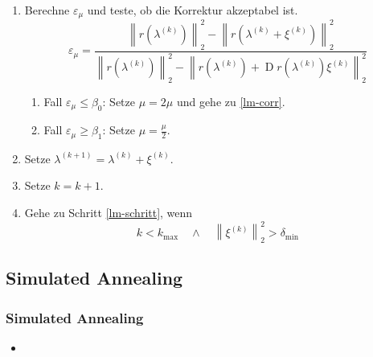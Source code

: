 \documentclass[aspectratio=169]{beamer}
\newcommand{\curvb}[1]{\left( #1 \right)}
\newcommand{\norm}[1]{\left\| #1 \right\|}
\DeclareMathOperator{\Deriv}{\m{D}}
\newcommand{\m}[1]{\mathrm{#1}}
\begin{document}
		\begin{frame}
			
			\begin{tcolorbox}[colframe=black,colbacktitle=white,coltitle=black, attach boxed title to top center={yshift=-2mm},enhanced, titlerule=0.1pt, boxrule=0.5pt, breakable, arc=5pt,title=Algorithmus:\quad Levenberg-Marquardt-Verfahren Teil 2]

				\begin{enumerate}[label=\normalfont (\arabic*), resume]
					\item Berechne $\varepsilon_\mu$ und teste, ob die Korrektur akzeptabel ist.
						\[ \varepsilon_\mu = \frac{ \norm{r\curvb{\lambda^{(k)}}}^2_2 - \norm{r\curvb{\lambda^{(k)}+\xi^{(k)}}}^2_2 }{ \norm{r\curvb{\lambda^{(k)}}}^2_2 - \norm{r\curvb{\lambda^{(k)}} + \Deriv r\curvb{\lambda^{(k)}}\xi^{(k)}}^2_2 } \]
						\begin{enumerate}[label=\normalfont (\roman*)]
							\item Fall $\varepsilon_\mu \leq \beta_0$: Setze $\mu = 2\mu$ und gehe zu \ref{lm-corr}.
							\item Fall $\varepsilon_\mu \geq \beta_1$: Setze $\mu = \frac{\mu}{2}$.
						\end{enumerate}
					\item Setze $\lambda^{(k+1)} = \lambda^{(k)} + \xi^{(k)}$.
					\item Setze $k=k+1$.
					\item Gehe zu Schritt \ref{lm-schritt}, wenn
						\[ k < k_\m{max} \quad \wedge \quad \norm{\xi^{(k)}}_2^2 > \delta_\m{min} \]
				\end{enumerate}
			\end{tcolorbox}

		\end{frame}


	\subsection{Simulated Annealing} %
	\label{sub:simulated_annealing}
	
		\begin{frame}
			\frametitle{Simulated Annealing}

			\begin{itemize}[label=$\circ$]
				\item 
			\end{itemize}
		\end{frame}
\end{document}
